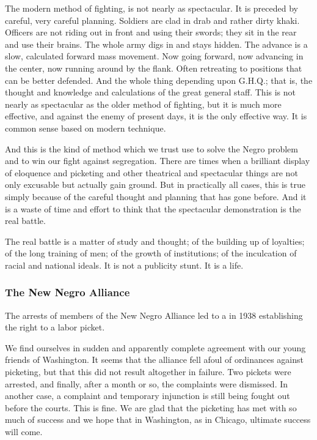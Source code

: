 \documentclass[letterpaper,10pt,english]{jupyterBook}
\begin{document}
\sphinxAtStartPar
The modern method of fighting, is not nearly as spectacular. It is preceded by careful, very careful planning. Soldiers are clad in drab and rather dirty khaki. Officers are not riding out in front and using their swords; they sit in the rear and use their brains. The whole army digs in and stays hidden. The advance is a slow, calculated forward mass movement. Now going forward, now advancing in the center, now running around by the flank. Often retreating to positions that can be better defended. And the whole thing depending upon G.H.Q.; that is, the thought and knowledge and calculations of the great general staff. This is not nearly as spectacular as the older method of fighting, but it is much more effective, and against the enemy of present days, it is the only effective way. It is common sense based on modern technique.

\sphinxAtStartPar
And this is the kind of method which we trust use to solve the Negro problem and to win our fight against segregation. There are times when a brilliant display of eloquence and picketing and other theatrical and spectacular things are not only excusable but actually gain ground. But in practically all cases, this is true simply because of the careful thought and planning that has gone before. And it is a waste of time and effort to think that the spectacular demonstration is the real battle.

\sphinxAtStartPar
The real battle is a matter of study and thought; of the building up of loyalties; of the long training of men; of the growth of institutions; of the inculcation of racial and national ideals. It is not a publicity stunt. It is a life.


\subsubsection{The New Negro Alliance}
\label{\detokenize{Volumes/41/06/counsels_of_despair:the-new-negro-alliance}}
\begin{sphinxShadowBox}
\sphinxstylesidebartitle{}

\sphinxAtStartPar
The arrests of members of the New Negro Alliance led to a  in 1938 establishing the right to a labor picket.
\end{sphinxShadowBox}

\sphinxAtStartPar
We find ourselves in sudden and apparently complete agreement with our young friends of Washington. It seems that the alliance fell afoul of ordinances against picketing, but that this did not result altogether in failure. Two pickets were arrested, and finally, after a month or so, the complaints were dismissed. In another case, a complaint and temporary injunction is still being fought out before the courts. This is fine. We are glad that the picketing has met with so much of success and we hope that in Washington, as in Chicago, ultimate success will come.
\end{document}
